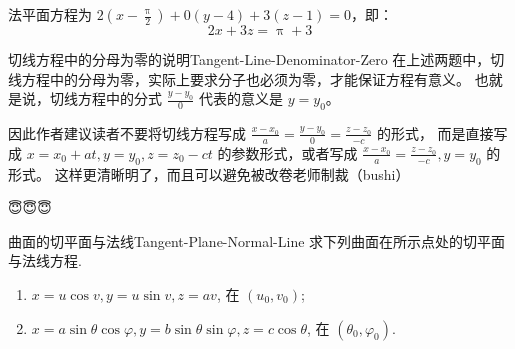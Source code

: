 \begin{solution}
    法平面方程为 $2\left(x - \frac{\uppi}{2}\right) + 0(y - 4) + 3(z - 1) = 0$，即：
    \begin{equation}
        \boxed{2x + 3z = \uppi + 3}
    \end{equation}
\end{solution}

\begin{note}{切线方程中的分母为零的说明}{Tangent-Line-Denominator-Zero}
    在上述两题中，切线方程中的分母为零，实际上要求分子也必须为零，才能保证方程有意义。
    也就是说，切线方程中的分式 $\frac{y - y_0}{0}$ 代表的意义是 $y = y_0$。

    {\kaishu
        因此作者建议读者不要将切线方程写成 $\frac{x - x_0}{a} = \frac{y - y_0}{0} = \frac{z - z_0}{-c}$ 的形式，
        而是直接写成 $x = x_0 + a t, y = y_0, z = z_0 - c t$ 的参数形式，或者写成 $\frac{x - x_0}{a} = \frac{z - z_0}{-c}, y = y_0$ 的形式。
        这样更清晰明了，而且可以避免被改卷老师制裁（bushi）
    }{\emojifont 🤪}

    {\emojifont 😇😇😇}

\end{note}

\begin{problem}{曲面的切平面与法线}{Tangent-Plane-Normal-Line}
    求下列曲面在所示点处的切平面与法线方程.
    \begin{enumerate}
        \item $x = u \cos v, y = u \sin v, z = av$, 在 $(u_0, v_0)$;
        \item $x = a \sin \theta \cos \varphi, y = b \sin \theta \sin \varphi, z = c \cos \theta$, 在 $(\theta_0, \varphi_0)$.
    \end{enumerate}
\end{problem}

